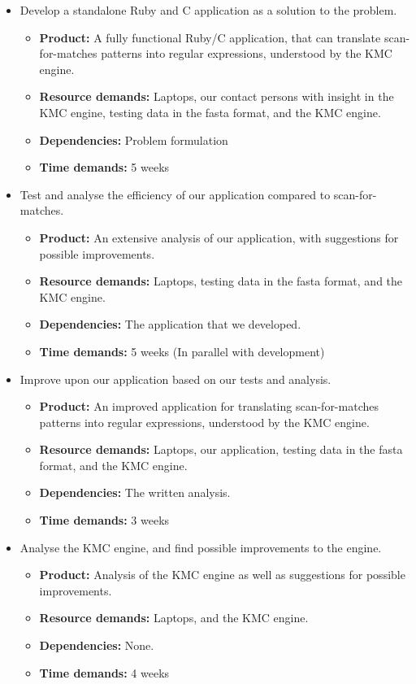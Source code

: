 \documentclass[12pt]{article}
\begin{document}
\begin{itemize}
	\item Develop a standalone Ruby and C application as a solution to the problem.
	\begin{itemize}
		\item \textbf{Product:} A fully functional Ruby/C application, that can translate scan-for-matches patterns into regular expressions, understood by the KMC engine.
		\item \textbf{Resource demands:} Laptops, our contact persons with insight in the KMC engine, testing data in the fasta format, and the KMC engine.
		\item \textbf{Dependencies:} Problem formulation
		\item \textbf{Time demands:} 5 weeks
	\end{itemize}
	
	\item Test and analyse the efficiency of our application compared to scan-for-matches.
	\begin{itemize}
		\item \textbf{Product:} An extensive analysis of our application, with suggestions for possible improvements.
		\item \textbf{Resource demands:} Laptops, testing data in the fasta format, and the KMC engine.
		\item \textbf{Dependencies:} The application that we developed.
		\item \textbf{Time demands:} 5 weeks (In parallel with development)
	\end{itemize}
	
	\item Improve upon our application based on our tests and analysis.
	\begin{itemize}
		\item \textbf{Product:} An improved application for translating scan-for-matches patterns into regular expressions, understood by the KMC engine.
		\item \textbf{Resource demands:} Laptops, our application, testing data in the fasta format, and the KMC engine.
		\item \textbf{Dependencies:} The written analysis.
		\item \textbf{Time demands:} 3 weeks
	\end{itemize}
	
	\item Analyse the KMC engine, and find possible improvements to the engine.
	\begin{itemize}
		\item \textbf{Product:} Analysis of the KMC engine as well as suggestions for possible improvements.
		\item \textbf{Resource demands:} Laptops, and the KMC engine.
		\item \textbf{Dependencies:} None.
		\item \textbf{Time demands:} 4 weeks
	\end{itemize}
\end{itemize}
\end{document}
